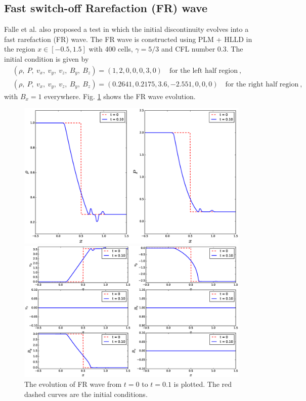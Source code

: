 \documentclass[10.5pt]{article}
\begin{document}
\subsection{Fast switch-off Rarefaction (FR) wave}
Falle et al.\cite{falle1998} also proposed a test in which the initial discontinuity evolves into
a fast rarefaction (FR) wave.
The FR wave is constructed using PLM + HLLD in the region $x\in[-0.5,1.5]$ with 400 cells, 
$\gamma=5/3$ and CFL number 0.3.
The initial condition is given by 
\begin{align}
	&(\rho,\ P,\ v_x,\ v_y,\ v_z,\ B_y,\ B_z) = (1,2,0,0,0,3,0) \quad
	\text{for the left half region}  \ , \\
	&(\rho,\ P,\ v_x,\ v_y,\ v_z,\ B_y,\ B_z) = (0.2641,0.2175,3.6,-2.551,0,0,0) \quad
	\text{for the right half region}  \ , 
\end{align}
with $B_x = 1$ everywhere. 
Fig. \ref{fig: FR test} shows the FR wave evolution.
\begin{figure}[ht]
	\centering
	\begin{minipage}[c]{0.9\textwidth}
		\includegraphics[width=1\textwidth]{FR1.eps}
	\end{minipage}
	\begin{minipage}[c]{0.9\textwidth}
		\includegraphics[width=1\textwidth]{FR2.eps}
	\end{minipage}%
\caption{The evolution of FR wave from $t=0$ to $t=0.1$ is plotted. 
The red dashed curves are the initial conditions.}
\label{fig: FR test}
\end{figure}
\end{document}
